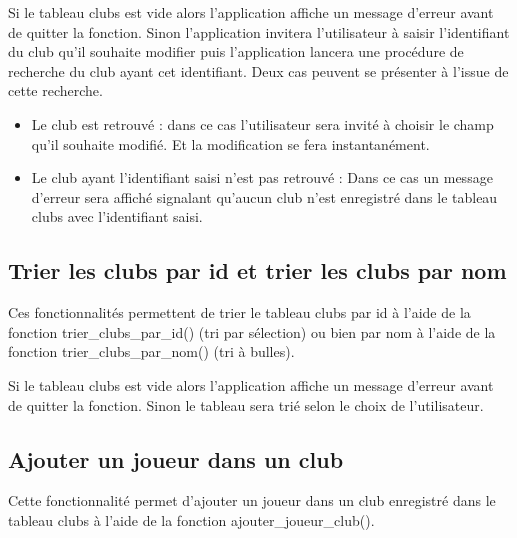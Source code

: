 \documentclass[12pt,a4paper]{report}
\begin{document}
Si le tableau clubs est vide alors l'application affiche un message d'erreur avant de quitter la fonction. 
Sinon l'application invitera l'utilisateur à saisir l'identifiant du club qu'il souhaite modifier puis l'application lancera une procédure de recherche du club ayant cet identifiant. Deux cas peuvent se présenter à l'issue de cette recherche.
\begin{itemize}
	\item Le club est retrouvé : dans ce cas l'utilisateur sera invité à choisir le champ qu'il souhaite modifié. Et la modification se fera instantanément.
	\item Le club ayant l'identifiant saisi n'est pas retrouvé : Dans ce cas un message d'erreur sera affiché signalant qu'aucun club n'est enregistré dans le tableau clubs avec l'identifiant saisi.
\end{itemize}

\subsection{Trier les clubs par id et trier les clubs par nom}
Ces fonctionnalités permettent de trier le tableau clubs par id à l'aide de la fonction trier\_clubs\_par\_id() (tri par sélection) ou bien par nom à l'aide de la fonction trier\_clubs\_par\_nom() (tri à bulles).

Si le tableau clubs est vide alors l'application affiche un message d'erreur avant de quitter la fonction. Sinon le tableau sera trié selon le choix de l'utilisateur.

\subsection{Ajouter un joueur dans un club}
Cette fonctionnalité permet d'ajouter un joueur dans un club enregistré dans le tableau clubs à l'aide de la fonction ajouter\_joueur\_club().
\end{document}
